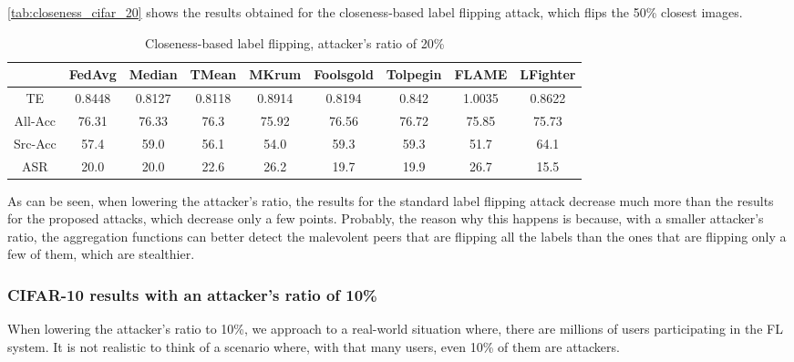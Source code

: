 \autoref{tab:closeness_cifar_20} shows the results obtained for the closeness-based label flipping attack, which flips the 50\% closest images. 

\begin{table}[h!]
        \centering
        \small
        \begin{adjustbox}{center}
        \begin{tabular}{|c|c|c|c|c|c|c|c|c|}
            \hline
            & FedAvg & Median & TMean & MKrum & Foolsgold & Tolpegin & FLAME & LFighter \\
            \hline
            TE & 0.8448 & 0.8127 & 0.8118 & 0.8914 & 0.8194 & 0.842 & 1.0035 & 0.8622 \\
            \hline
            All-Acc & 76.31 & 76.33 & 76.3 & 75.92 & 76.56 & 76.72 & 75.85 & 75.73 \\
            \hline
            Src-Acc & 57.4 & 59.0 & 56.1 & 54.0 & 59.3 & 59.3 & 51.7 & 64.1 \\
            \hline
            ASR & 20.0 & 20.0 & 22.6 & 26.2 & 19.7 & 19.9 & 26.7 & 15.5 \\
            \hline
        \end{tabular}
        \end{adjustbox}
        \caption{Closeness-based label flipping, attacker's ratio of 20\%}
        \label{tab:closeness_cifar_20}
    \end{table}

As can be seen, when lowering the attacker's ratio, the results for the standard label flipping attack decrease much more than the results for the proposed attacks, which decrease only a few points. Probably, the reason why this happens is because, with a smaller attacker's ratio, the aggregation functions can better detect the malevolent peers that are flipping all the labels than the ones that are flipping only a few of them, which are stealthier.

\subsubsection{CIFAR-10 results with an attacker's ratio of 10\%}
When lowering the attacker's ratio to 10\%, we approach to a real-world situation where, there are millions of users participating in the FL system. It is not realistic to think of a scenario where, with that many users, even 10\% of them are attackers.

